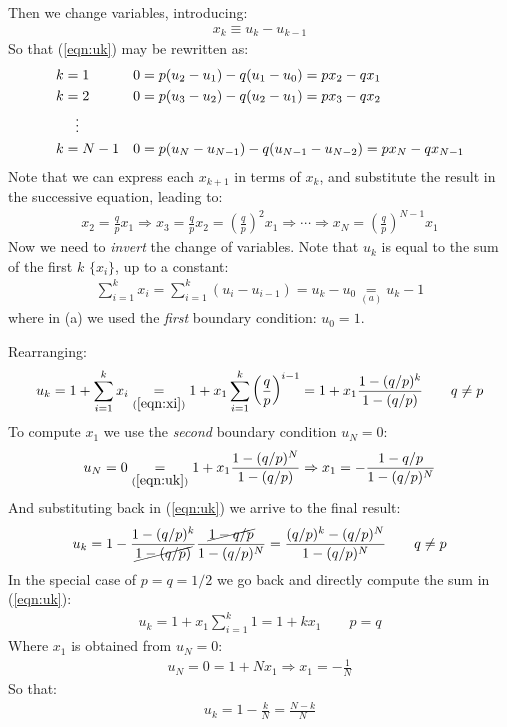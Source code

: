 \documentclass[../template.tex]{subfiles}
\begin{document}
Then we change variables, introducing:
\begin{align*}
    x_k \equiv u_k - u_{k-1}
\end{align*}
So that (\ref{eqn:uk}) may be rewritten as:
\begin{align*}
    k&=1 && 0 = p(u_2-u_1) - q(u_1-u_0) = px_2 - qx_1\\
    k&=2 && 0 = p(u_3-u_2) - q(u_2-u_1) = px_3 - qx_2\\
    &\>\>\>\vdots \span \span\\
    k&=N-1 &&0=p(u_N - u_{N-1}) - q(u_{N-1} - u_{N-2}) = px_N - qx_{N-1}
\end{align*}
Note that we can express each $x_{k+1}$ in terms of $x_k$, and substitute the result in the successive equation, leading to:
\begin{align}\label{eqn:xi}
    x_2 = \frac{q}{p} x_1 \Rightarrow x_3 = \frac{q}{p} x_2 = \left(\frac{q}{p} \right)^2 x_1 \Rightarrow \cdots  \Rightarrow x_N = \left(\frac{q}{p} \right)^{N-1} x_{1}
\end{align}
Now we need to \textit{invert} the change of variables. Note that $u_k$ is equal to the sum of the first $k$ $\{x_i\}$, up to a constant: 
\begin{align}
    \sum_{i=1}^k x_i = \sum_{i=1}^k (u_i - u_{i-1}) = u_k - u_0 \underset{(a)}{=}  u_k - 1
\end{align}
where in (a) we used the \textit{first} boundary condition: $u_0 = 1$.

Rearranging:
\begin{align}\label{eqn:uk}
    u_k = 1 + \sum_{i=1}^k x_i \underset{(\ref{eqn:xi})}{=}  1 + x_1 \sum_{i=1}^k \left(\frac{q}{p} \right)^{i-1} = 1 + x_1 \frac{1-(q/p)^{k}}{1-(q/p)} \qquad q \neq p
\end{align}
To compute $x_1$ we use the \textit{second}  boundary condition $u_N = 0$:
\begin{align*}
    u_N = 0 \underset{(\ref{eqn:uk})}{=}  1+ x_1 \frac{1-(q/p)^{N}}{1-(q/p)} \Rightarrow x_1 = - \frac{1-q/p}{1-(q/p)^N} 
\end{align*}
And substituting back in (\ref{eqn:uk}) we arrive to the final result:
\begin{align} \label{eqn:uk-f}
    u_k = 1 - \frac{1-(q/p)^{k}}{\cancel{1-(q/p)}} \frac{\cancel{1-q/p}}{1-(q/p)^N} = \frac{(q/p)^k - (q/p)^N}{1-(q/p)^N} \qquad q \neq p
\end{align}
In the special case of $p=q=1/2$ we go back and directly compute the sum in (\ref{eqn:uk}):
\begin{align*}
    u_k = 1 + x_1 \sum_{i=1}^k 1 = 1 + k x_1 \qquad p = q
\end{align*}
Where $x_1$ is obtained from $u_N = 0$:
\begin{align*}
    u_N = 0 = 1 + N x_1 \Rightarrow x_1 = -\frac{1}{N} 
\end{align*}
So that:
\begin{align*}
    u_k = 1 - \frac{k}{N} = \frac{N - k}{N} 
\end{align*}
\end{document}
